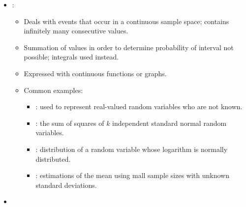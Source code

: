 \begin{itemize}
\begin{itemize}
      \item {}: 
      \begin{itemize}
        \item Deals with events that occur in a continuous sample space; contains infinitely many consecutive values. 
        \item Summation of values in order to determine probability of interval not possible; integrals used instead.
        \item Expressed with continuous functions or graphs.
        \item Common examples:
        \begin{multicols}{2}
          \begin{itemize}
            \item {}: used to represent real-valued random variables who are not known.
            \item {}: the sum of squares of \(k\) independent standard normal random variables.
            \item {}: distribution of a random variable whose logarithm is normally distributed.
            \item {}: estimations of the mean using mall sample sizes with unknown standard deviations.
          \end{itemize}
        \end{multicols}
      \end{itemize}
      \item {}
    \end{itemize}
\end{itemize}

